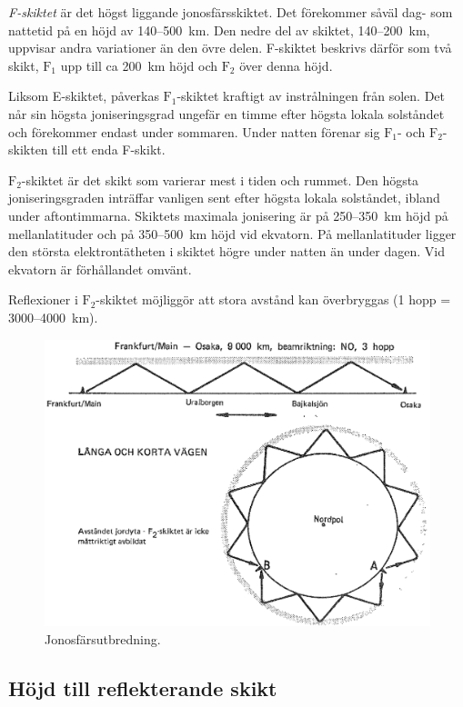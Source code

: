 \emph{F-skiktet} är det högst liggande jonosfärsskiktet.
Det förekommer såväl dag- som nattetid på en höjd av 140--500~km.
Den nedre del av skiktet, 140--200~km, uppvisar andra variationer än den övre
delen.
F-skiktet beskrivs därför som två skikt, \(\mathrm{F_1}\) upp till ca 200~km
höjd och \(\mathrm{F_2}\) över denna höjd.

Liksom E-skiktet, påverkas \(\mathrm{F_1}\)-skiktet kraftigt av
instrålningen från solen.
Det når sin högsta joniseringsgrad ungefär en timme efter högsta lokala
solståndet och förekommer endast under sommaren.
Under natten förenar sig \(\mathrm{F_1}\)- och \(\mathrm{F_2}\)-skikten till
ett enda F-skikt.

\(\mathrm{F_2}\)-skiktet är det skikt som varierar mest i tiden och rummet.
Den högsta joniseringsgraden inträffar vanligen sent efter högsta lokala
solståndet, ibland under aftontimmarna.
Skiktets maximala jonisering är på 250--350~km höjd på mellanlatituder och på
350--500~km höjd vid ekvatorn.
På mellanlatituder ligger den största elektrontätheten i skiktet högre under
natten än under dagen.
Vid ekvatorn är förhållandet omvänt.

Reflexioner i \(\mathrm{F_2}\)-skiktet möjliggör att stora
avstånd kan överbryggas (1 hopp = 3000--4000~km).

\begin{figure}
  \includegraphics[width=\textwidth]{images/cropped_pdfs/bild_2_7-08.pdf}
  \caption{Jonosfärsutbredning.}
  \label{fig:bildII7-8}
\end{figure}

\subsection{Höjd till reflekterande skikt}

